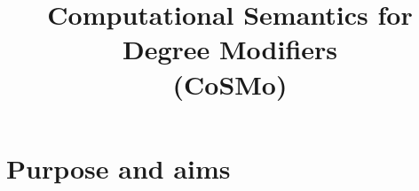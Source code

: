 \documentclass[11pt,a4paper]{article}
\title{%
Computational Semantics for Degree Modifiers\\ %
(CoSMo)
}
\date{}
\author{}
\newcommand{\instruction}[1]{}
\begin{document}
\maketitle
\section{Purpose and aims}
\instruction{State the overall purpose and specific goals of the research project.}












\end{document}
